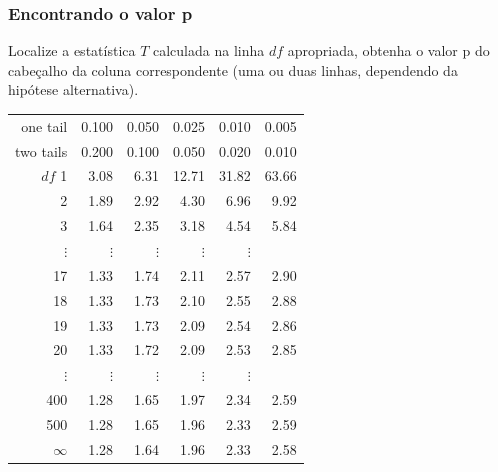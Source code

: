 
\begin{frame}
\frametitle{Encontrando o valor p}
\justifying
\scriptsize
Localize a estatística $ T $ calculada na linha $ df $ apropriada, obtenha o valor p do cabeçalho da coluna correspondente (uma ou duas linhas, dependendo da hipótese alternativa).

{\scriptsize
\begin{center}
\begin{tabular}{r | rrr rr}
one tail & \hspace{1.5mm}  0.100 & \hspace{1.5mm} 0.050 & \hspace{1.5mm} 0.025 & \hspace{1.5mm} 0.010 & \hspace{1.5mm} 0.005  \\
two tails & 0.200 & 0.100 & 0.050 & 0.020 & 0.010 \\
\hline
{$df$} \hfill 1  &  {  3.08} & {  6.31} & { 12.71} & { 31.82} & { 63.66}  \\ 
2  &  {  1.89} & {  2.92} & {  4.30} & {  6.96} & {  9.92}  \\ 
3  &  {  1.64} & {  2.35} & {  3.18} & {  4.54} & {  5.84}  \\ 
$\vdots$ & $\vdots$ &$\vdots$ &$\vdots$ &$\vdots$ & \\
17  &  {  1.33} & {  1.74} & {  2.11} & {  2.57} & {  2.90}  \\ 
18  &  {  1.33} & {  1.73} & {  2.10} & {  2.55} & {  2.88}  \\ 
19  &  {  1.33} & {  1.73} & {  2.09} & {  2.54} & {  2.86}  \\ 
20  &  {  1.33} & {  1.72} & {  2.09} & {  2.53} & {  2.85}  \\ 
$\vdots$ & $\vdots$ &$\vdots$ &$\vdots$ &$\vdots$ & \\
400  &  {  1.28} & {  1.65} & {  1.97} & {  2.34} & {  2.59}  \\ 
500  &  {  1.28} & {  1.65} & {  1.96} & {  2.33} & {  2.59}  \\ 
$\infty$  &  {  1.28} & {  1.64} & {  1.96} & {  2.33} & {  2.58}  \\ 
\end{tabular}
\end{center}
}
\end{frame}


